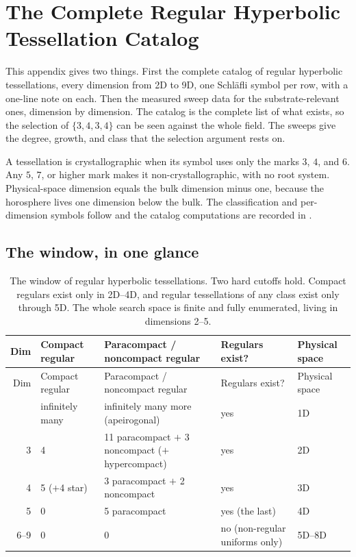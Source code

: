 \section{The Complete Regular Hyperbolic Tessellation Catalog}
\label{sec:tessellation-catalog}

This appendix gives two things. First the complete catalog of regular hyperbolic tessellations, every dimension
from 2D to 9D, one Schl\"afli symbol per row, with a one-line note on each. Then the measured sweep data for the
substrate-relevant ones, dimension by dimension. The catalog is the complete list of what exists, so the
selection of $\{3,4,3,4\}$ can be seen against the whole field. The sweeps give the degree, growth, and class
that the selection argument rests on.

A tessellation is crystallographic when its symbol uses only the marks $3$, $4$, and $6$. Any $5$, $7$, or higher
mark makes it non-crystallographic, with no root system. Physical-space dimension equals the bulk dimension minus
one, because the horosphere lives one dimension below the bulk. The classification and per-dimension symbols
follow \cite{coxeter1973} and the catalog computations are recorded in \cite{pollard2026vibetest}.

\subsection{The window, in one glance}

{\small
\begin{longtable}{r p{1.4in} p{1.9in} p{1.1in} l}
\caption{The window of regular hyperbolic tessellations. Two hard cutoffs hold. Compact regulars exist only in
2D--4D, and regular tessellations of any class exist only through 5D. The whole search space is finite and fully
enumerated, living in dimensions 2--5.}
\label{tab:window}\\
\toprule
Dim & Compact regular & Paracompact / noncompact regular & Regulars exist? & Physical space \\
\midrule
\endfirsthead
\toprule
Dim & Compact regular & Paracompact / noncompact regular & Regulars exist? & Physical space \\
\midrule
\endhead
\bottomrule
\endfoot
2 & infinitely many & infinitely many more (apeirogonal) & yes & 1D \\
3 & 4 & 11 paracompact $+$ 3 noncompact ($+$ hypercompact) & yes & 2D \\
4 & 5 ($+$4 star) & 3 paracompact $+$ 2 noncompact & yes & 3D \\
5 & 0 & 5 paracompact & yes (the last) & 4D \\
6--9 & 0 & 0 & no (non-regular uniforms only) & 5D--8D \\
\end{longtable}}

